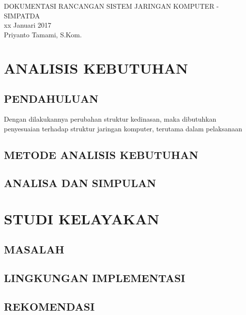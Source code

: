\documentclass[pdftex,12pt, oneside]{article}
\begin{document}
\sloppy %

\begin{center}
{\large DOKUMENTASI RANCANGAN SISTEM JARINGAN KOMPUTER - SIMPATDA}
\\[1cm]
xx Januari 2017\\
Priyanto Tamami, S.Kom.
\end{center}




\section{ANALISIS KEBUTUHAN}

\subsection{PENDAHULUAN}

Dengan dilakukannya perubahan struktur kedinasan, maka dibutuhkan penyesuaian terhadap struktur jaringan komputer, terutama dalam pelaksanaan 

\subsection{METODE ANALISIS KEBUTUHAN}

\subsection{ANALISA DAN SIMPULAN}

\section{STUDI KELAYAKAN}

\subsection{MASALAH}

\subsection{LINGKUNGAN IMPLEMENTASI}

\subsection{REKOMENDASI}
\end{document}
